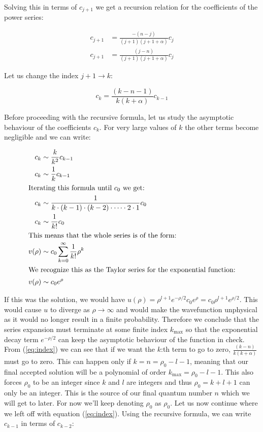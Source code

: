 \documentclass{article}
\begin{document}
    Solving this in terms of $c_{j + 1}$ we get a recursion relation for the coefficients of the power series:

    \begin{align}
        c_{j + 1} &= \frac{-(n - j)}{(j + 1)(j + 1 + \alpha)}c_j \\
        c_{j + 1} &= \frac{(j - n)}{(j + 1)(j + 1 + \alpha)}c_j
    \end{align}

    Let us change the index $j + 1 \to k$:

    \begin{equation}
        \label{eq:index}
        c_{k} = \frac{(k - n - 1)}{k(k + \alpha)}c_{k - 1}
    \end{equation}

    Before proceeding with the recursive formula, let us study the asymptotic behaviour of the coefficients $c_k$. For very large values of $k$ the other terms
    become negligible and we can write:

    \begin{align}
        c_{k} &\sim \frac{k}{k^2}c_{k - 1} \\
        c_{k} &\sim \frac{1}{k}c_{k - 1} \\
        \intertext{Iterating this formula until $c_0$ we get:}
        c_{k} &\sim \frac{1}{k\cdot(k - 1)\cdot(k - 2)\cdot\dots\cdot2\cdot1}c_0 \\
        c_{k} &\sim \frac{1}{k!}c_0 \\
        \intertext{This means that the whole series is of the form:}
        v(\rho) &\sim c_0\sum_{k = 0}^{\infty}\frac{1}{k!}\rho^{k} \\
        \intertext{We recognize this as the Taylor series for the exponential function:}
        v(\rho) &\sim c_0e^{\rho}
    \end{align}
    
    If this was the solution, we would have $u(\rho) = \rho^{l + 1}e^{-\rho/2}c_0e^{\rho} = c_0\rho^{l + 1}e^{\rho/2}$. This would cause $u$ to diverge as $\rho\to\infty$ and would make the wavefunction
    unphysical as it would no longer result in a finite probability. Therefore we conclude that the series expansion must terminate at some finite index $k_{\mathrm{max}}$ so that the exponential
    decay term $e^{-\rho/2}$ can keep the asymptotic behaviour of the function in check. From (\ref{eq:index}) we can see that if we want the $k$:th term to go to zero, $\frac{(k - n)}{k(k + \alpha)}$
    must go to zero. This can happen only if $k = n = \rho_{0} - l - 1$, meaning that our final accepted solution will be a polynomial of order $k_{\mathrm{max}} = \rho_{0} - l - 1$. This also forces
    $\rho_{0}$ to be an integer since $k$ and $l$ are integers and thus $\rho_{0} = k + l + 1$ can only be an integer. This is the source of our final quantum number $n$ which we will get to later. For
    now we'll keep denoting $\rho_{0}$ as $\rho_{0}$. Let us now continue where we left off with equation (\ref{eq:index}). Using the recursive formula, we can write $c_{k - 1}$ in terms of $c_{k - 2}$:
\end{document}
